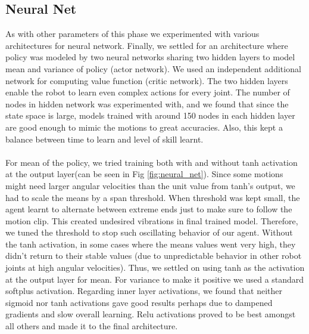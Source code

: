 \subsection{Neural Net}
As with other parameters of this phase we experimented with various architectures for neural network. Finally, we settled for an architecture where policy was modeled by two neural networks sharing two hidden layers to model mean and variance of policy (actor network). We used an independent additional network for computing value function (critic network). The two hidden layers enable the robot to learn even complex actions for every joint. 
The number of nodes in hidden network was experimented with, and we found that since the state space is large, models trained with around 150 nodes in each hidden layer are good enough to mimic the motions to great accuracies. Also, this kept a balance between time to learn and level of skill learnt.
\\\\
For mean of the policy, we tried training both with and without tanh activation at the output layer(can be seen in Fig \ref{fig:neural_net}). Since some motions might need larger angular velocities than the unit value from tanh's output, we had to scale the means by a span threshold. When threshold was kept small, the agent learnt to alternate between extreme ends just to make sure to follow the motion clip. This created undesired vibrations in final trained model. Therefore, we tuned the threshold to stop such oscillating behavior of our agent. Without the tanh activation, in some cases where the means values went very high, they didn't return to their stable values (due to unpredictable behavior in other robot joints at high angular velocities). Thus, we settled on using tanh as the activation at the output layer for mean. For variance to make it positive we used a standard softplus activation. Regarding inner layer activations, we found that neither sigmoid nor tanh activations gave good results perhaps due to dampened gradients and slow overall learning. Relu activations proved to be best amongst all others and made it to the final architecture.
